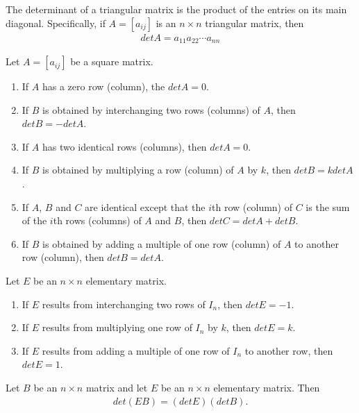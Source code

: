 \documentclass{article}
\begin{document}
\begin{theorem}
    The determinant of a triangular matrix is the product of the entries on its main diagonal.
    Specifically, if $A=[a_{ij}]$ is an $n\times n$ triangular matrix, then
    \begin{align*}
        det A = a_{11}a_{22}\cdots a_{nn}
    \end{align*}
\end{theorem}
\begin{theorem}
    Let $A=[a_{ij}]$ be a square matrix.
    \begin{enumerate}
        \item If $A$ has a zero row (column), the $det A = 0$.
        \item If $B$ is obtained by interchanging two rows (columns) of $A$, then $det B = -det A$.
        \item If $A$ has two identical rows (columns), then $det A = 0$.
        \item If $B$ is obtained by multiplying a row (column) of $A$ by $k$, then $det B = k det A$.
        \item If $A$, $B$ and $C$ are identical except that the $i$th row (column) of $C$ is the sum of the $i$th rows (columns) of $A$ and $B$, then $det C = det A + det B$.
        \item If $B$ is obtained by adding a multiple of one row (column) of $A$ to another row (column), then $det B = det A$.
    \end{enumerate}
\end{theorem}
\begin{theorem}
    Let $E$ be an $n\times n$ elementary matrix.
    \begin{enumerate}
        \item If $E$ results from interchanging two rows of $I_n$, then $det E = -1$.
        \item If $E$ results from multiplying one row of $I_n$ by $k$, then $det E = k$.
        \item If $E$ results from adding a multiple of one row of $I_n$ to another row, then $det E = 1$.
    \end{enumerate}
\end{theorem}
\begin{theorem}
    Let $B$ be an $n\times n$ matrix and let $E$ be an $n\times n$ elementary matrix. Then
    \begin{align*}
        det(EB) = (det E)(det B).
    \end{align*}
\end{theorem}
\end{document}

